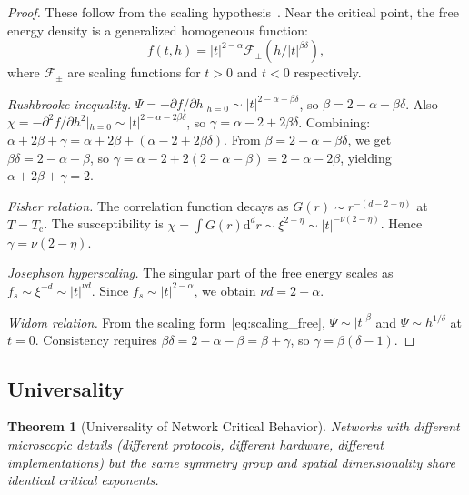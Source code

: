 \documentclass[11pt,twocolumn,a4paper]{article}
\newtheorem{theorem}{Theorem}[section]
\theoremstyle{definition}
\newcommand{\dif}{\mathrm{d}}
\newcommand{\Tc}{T_{\mathrm{c}}}
\begin{document}
\begin{proof}
These follow from the scaling hypothesis~\cite{kadanoff1966,wilson1971}. Near the
critical point, the free energy density is a generalized homogeneous function:
\begin{equation}\label{eq:scaling_free}
  f(t, h) = |t|^{2-\alpha} \mathcal{F}_\pm(h/|t|^{\beta\delta}),
\end{equation}
where $\mathcal{F}_\pm$ are scaling functions for $t > 0$ and $t < 0$ respectively.

\emph{Rushbrooke inequality.}
$\Psi = -\partial f/\partial h|_{h=0} \sim |t|^{2-\alpha-\beta\delta}$, so
$\beta = 2 - \alpha - \beta\delta$. Also $\chi = -\partial^2 f/\partial h^2|_{h=0}
\sim |t|^{2-\alpha-2\beta\delta}$, so $\gamma = \alpha - 2 + 2\beta\delta$.
Combining: $\alpha + 2\beta + \gamma = \alpha + 2\beta + (\alpha - 2 + 2\beta\delta)$.
From $\beta = 2 - \alpha - \beta\delta$, we get $\beta\delta = 2 - \alpha - \beta$,
so $\gamma = \alpha - 2 + 2(2 - \alpha - \beta) = 2 - \alpha - 2\beta$, yielding
$\alpha + 2\beta + \gamma = 2$.

\emph{Fisher relation.}
The correlation function decays as $G(r) \sim r^{-(d-2+\eta)}$ at $T = \Tc$. The
susceptibility is $\chi = \int G(r) \dif^d r \sim \xi^{2-\eta} \sim |t|^{-\nu(2-\eta)}$.
Hence $\gamma = \nu(2 - \eta)$.

\emph{Josephson hyperscaling.}
The singular part of the free energy scales as $f_s \sim \xi^{-d} \sim |t|^{\nu d}$.
Since $f_s \sim |t|^{2-\alpha}$, we obtain $\nu d = 2 - \alpha$.

\emph{Widom relation.}
From the scaling form~\eqref{eq:scaling_free}, $\Psi \sim |t|^\beta$ and
$\Psi \sim h^{1/\delta}$ at $t = 0$. Consistency requires
$\beta\delta = 2 - \alpha - \beta = \beta + \gamma$, so $\gamma = \beta(\delta - 1)$.
\end{proof}

\subsection{Universality}\label{sec:rg:universality}

\begin{theorem}[Universality of Network Critical Behavior]\label{thm:universality}
Networks with different microscopic details (different protocols, different hardware,
different implementations) but the same symmetry group and spatial dimensionality share
identical critical exponents.
\end{theorem}
\end{document}
